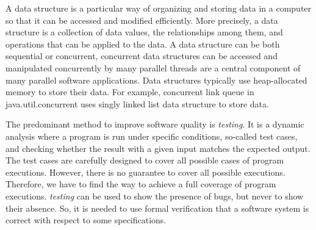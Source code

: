 A data structure is a particular way of organizing and storing data in a computer so that it can be accessed and modified efficiently. More precisely, a data structure is a collection of data values, the relationships among them, and operations that can be applied to the data. 
A data structure can be both sequential or concurrent, concurrent data structures can be accessed and manipulated concurrently by many parallel threads are a central component of many parallel software applications. 
Data structures typically use heap-allocated memory to store their data. For example, concurrent link queue in java.util.concurrent uses singly linked list data structure to store data.   





The predominant method to improve software quality is
\emph{testing}. It is a dynamic analysis where a program is run under specific conditions, so-called test cases, and checking
whether the result with a given input matches the expected output.
%
The test cases are carefully designed to cover all possible cases of program executions.
%
However, there is no guarantee to cover all possible executions. Therefore, we have to find the way to achieve a full coverage of program executions. \emph{testing} can be used to show the presence of bugs, but never to show their absence. So, it is needed to use formal verification that a software system is correct with respect to some specifications. %
%

